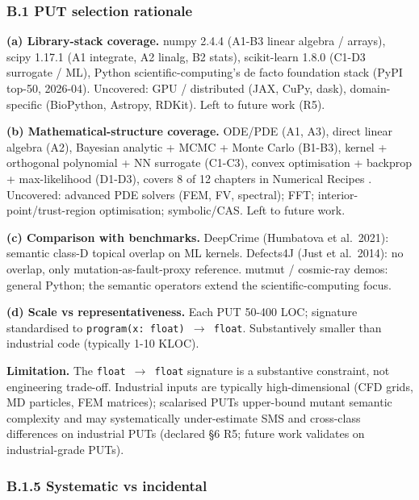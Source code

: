 \documentclass[review,12pt,authoryear]{elsarticle}
\begin{document}
\subsubsection{B.1 PUT selection rationale}\label{b.1-put-selection-rationale-detailed-coverage-argument}

\textbf{(a) Library-stack coverage.} numpy 2.4.4 (A1-B3 linear algebra /
arrays), scipy 1.17.1 (A1 integrate, A2 linalg, B2 stats), scikit-learn
1.8.0 (C1-D3 surrogate / ML), Python scientific-computing's de facto
foundation stack (PyPI top-50, 2026-04). Uncovered: GPU / distributed
(JAX, CuPy, dask), domain-specific (BioPython, Astropy, RDKit). Left to
future work (R5).

\textbf{(b) Mathematical-structure coverage.} ODE/PDE (A1, A3), direct
linear algebra (A2), Bayesian analytic + MCMC + Monte Carlo (B1-B3),
kernel + orthogonal polynomial + NN surrogate (C1-C3), convex
optimisation + backprop + max-likelihood (D1-D3), covers 8 of 12
chapters in Numerical Recipes \citep{press2007numerical}. Uncovered: advanced
PDE solvers (FEM, FV, spectral); FFT; interior-point/trust-region
optimisation; symbolic/CAS. Left to future work.

\textbf{(c) Comparison with benchmarks.} DeepCrime (Humbatova et
al.~2021): semantic class-D topical overlap on ML kernels. Defects4J (Just et
al.~2014): no overlap, only mutation-as-fault-proxy reference. mutmut /
cosmic-ray demos: general Python; the semantic operators extend the scientific-computing focus.

\textbf{(d) Scale vs representativeness.} Each PUT 50-400 LOC; signature
standardised to \texttt{program(x:\ float)\ $\to$\ float}. Substantively
smaller than industrial code (typically 1-10 KLOC).

\textbf{Limitation.} The \texttt{float\ $\to$\ float} signature is a
substantive constraint, not engineering trade-off. Industrial inputs are
typically high-dimensional (CFD grids, MD particles, FEM matrices);
scalarised PUTs upper-bound mutant semantic complexity and may
systematically under-estimate SMS and cross-class differences on
industrial PUTs (declared §6 R5; future work validates on industrial-grade PUTs).

\subsubsection{B.1.5 Systematic vs incidental}\label{b.1.5-systematic-vs-incidental}
\end{document}

